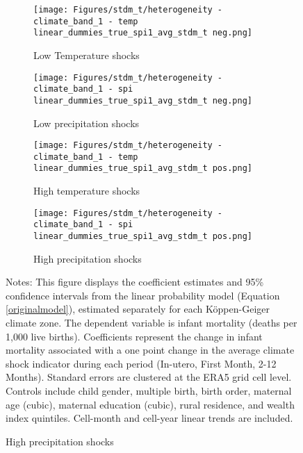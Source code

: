 \documentclass[a4paper]{article}
\begin{document}
\begin{figure}[t!]
    \caption{Climate shocks impacts on different climate zones}
    \label{fig:climate_zones_heterogeneity}
    \begin{center}    
    \begin{subfigure}[t]{0.45\textwidth}
        \centering
        \texttt{[image: Figures/stdm\_t/heterogeneity - climate\_band\_1 - temp linear\_dummies\_true\_spi1\_avg\_stdm\_t neg.png]}
        \caption{Low Temperature shocks}
    \end{subfigure}%
    \begin{subfigure}[t]{0.45\textwidth}
        \centering
        \texttt{[image: Figures/stdm\_t/heterogeneity - climate\_band\_1 - spi linear\_dummies\_true\_spi1\_avg\_stdm\_t neg.png]}
        \caption{Low precipitation shocks}
    \end{subfigure} \hfill
    \begin{subfigure}[t]{0.45\textwidth}
        \centering
        \texttt{[image: Figures/stdm\_t/heterogeneity - climate\_band\_1 - temp linear\_dummies\_true\_spi1\_avg\_stdm\_t pos.png]}
        \caption{High temperature shocks}    
    \end{subfigure}
    \begin{subfigure}[t]{0.45\textwidth}
        \centering
        \texttt{[image: Figures/stdm\_t/heterogeneity - climate\_band\_1 - spi linear\_dummies\_true\_spi1\_avg\_stdm\_t pos.png]}
        \caption{High precipitation shocks}    
    \end{subfigure} \hfill
    \end{center}

    \footnotesize{Notes: This figure displays the coefficient estimates and 95\% confidence intervals from the linear probability model (Equation \ref{originalmodel}), estimated separately for each Köppen-Geiger climate zone.  The dependent variable is infant mortality (deaths per 1,000 live births).  Coefficients represent the change in infant mortality associated with a one point change in the average climate shock indicator during each period (In-utero, First Month, 2-12 Months).  Standard errors are clustered at the ERA5 grid cell level.  Controls include child gender, multiple birth, birth order, maternal age (cubic), maternal education (cubic), rural residence, and wealth index quintiles. Cell-month and cell-year linear trends are included.}

\end{figure}
\end{document}
